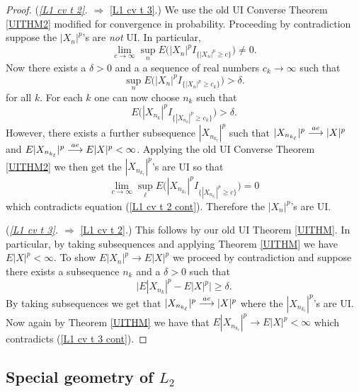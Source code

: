 \begin{proof}
({\sl \ref{L1 cv t 2}. $\Longrightarrow$} \ref{L1 cv t 3}.) 
We use the old UI Converse Theorem \ref{UITHM2} modified for convergence in probability. Proceeding by contradiction suppose the $|X_{n}|^p$'s are {\it not} UI. In particular,
\[
\lim_{c\rightarrow \infty} \sup_n E\bigl(|X_{n}|^pI_{\{|X_{n}|^p\geq c\}}\bigr) \neq 0.
\]
Now there exists a $\delta>0$ and a  a sequence of real numbers $c_k\rightarrow \infty$ such that 
\[
 \sup_n E\bigl(|X_{n}|^pI_{\{|X_{n}|^p\geq c_k\}}\bigr) >\delta.
\]
for all $k$. For each $k$ one can now choose $n_k$ such that 
\begin{equation}
\label{L1 cv t 2 cont}
E\bigl(|X_{n_k}|^pI_{\{|X_{n_k}|^p\geq c_k\}}\bigr) >\delta.
\end{equation}
However, there exists a further subsequence $|X_{n_{k_\ell}}|^p$ such that  $|X_{n_{k_\ell}}|^p\overset{\small ae} \longrightarrow |X|^p$ and  $E|X_{n_{k_\ell}}|^p\overset{\small ae} \longrightarrow E|X|^p<\infty$. Applying the old UI Converse Theorem \ref{UITHM2} we then get the $|X_{n_{k_\ell}}|^p$'s are UI so that 
\[
\lim_{c\rightarrow \infty} \sup_\ell E\bigl(|X_{n_{k_\ell}}|^pI_{\{|X_{n_{k_\ell}}|^p\geq c\}}\bigr) = 0
\]
which contradicts equation (\ref{L1 cv t 2 cont}). Therefore the $|X_{n}|^p$'s are UI.



({\sl \ref{L1 cv t 3}. $\Longrightarrow$} \ref{L1 cv t 2}.) 
This follows by our old UI Theorem \ref{UITHM}. In particular, by taking subsequences and applying  Theorem  \ref{UITHM} we have $E|X|^p<\infty$. To show $E|X_{n}|^p\rightarrow E|X|^p$ we proceed by contradiction and suppose there exists a subsequence $n_k$ and a $\delta>0$ such that 
\begin{equation}
\label{L1 cv t 3 cont}
\bigl|E|X_{n_k}|^p - E|X|^p\bigr|\geq \delta.
\end{equation}
By taking subsequences we get that $|X_{n_{k_\ell}}|^p\overset{\small ae} \longrightarrow |X|^p$ where the $|X_{n_{k_\ell}}|^p$'s are UI. Now again by Theorem \ref{UITHM} we have that
 $E|X_{n_{k_\ell}}|^p\rightarrow E|X|^p<\infty$ which contradicts (\ref{L1 cv t 3 cont}).



\end{proof}




%
%
\subsection{Special geometry of $L_2$}

